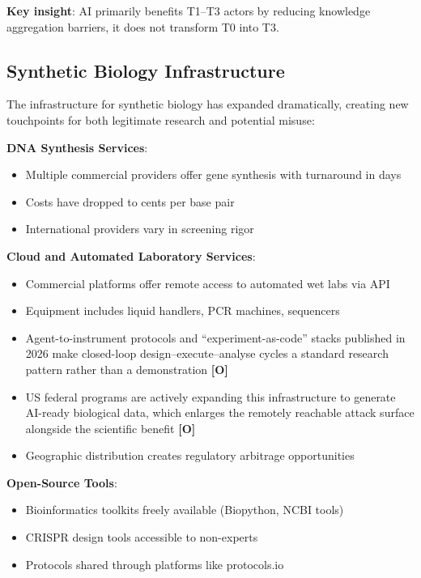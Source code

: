 \documentclass[11pt,letterpaper]{article}
\begin{document}
\textbf{Key insight}: AI primarily benefits T1--T3 actors by reducing knowledge aggregation barriers, it does not transform T0 into T3.

\subsection{Synthetic Biology Infrastructure}

The infrastructure for synthetic biology has expanded dramatically, creating new touchpoints for both legitimate research and potential misuse:

\textbf{DNA Synthesis Services}:
\begin{itemize}[nosep]
  \item Multiple commercial providers offer gene synthesis with turnaround in days
  \item Costs have dropped to cents per base pair
  \item International providers vary in screening rigor
\end{itemize}

\textbf{Cloud and Automated Laboratory Services}:
\begin{itemize}[nosep]
  \item Commercial platforms offer remote access to automated wet labs via API
  \item Equipment includes liquid handlers, PCR machines, sequencers
  \item Agent-to-instrument protocols and ``experiment-as-code'' stacks published in 2026 make closed-loop design--execute--analyse cycles a standard research pattern rather than a demonstration \textbf{[O]}
  \item US federal programs are actively expanding this infrastructure to generate AI-ready biological data, which enlarges the remotely reachable attack surface alongside the scientific benefit \textbf{[O]}
  \item Geographic distribution creates regulatory arbitrage opportunities
\end{itemize}

\textbf{Open-Source Tools}:
\begin{itemize}[nosep]
  \item Bioinformatics toolkits freely available (Biopython, NCBI tools)
  \item CRISPR design tools accessible to non-experts
  \item Protocols shared through platforms like protocols.io
\end{itemize}
\end{document}
